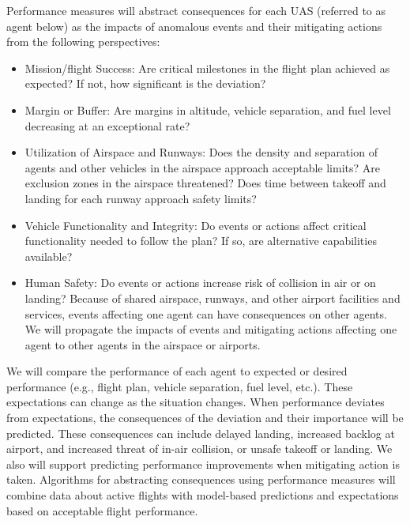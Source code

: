 Performance measures will abstract consequences for each UAS (referred
to as agent below) as the impacts of anomalous events and their
mitigating actions from the following perspectives:
\begin{itemize}
\item	Mission/flight Success: Are critical milestones in the flight plan achieved as expected?  If not, how significant is the deviation?
\item	Margin or Buffer: Are margins in altitude, vehicle separation, and fuel level decreasing at an exceptional rate?  
\item	Utilization of Airspace and Runways: Does the density and separation of agents and other vehicles in the airspace approach acceptable limits? Are exclusion zones in the airspace threatened? Does time between takeoff and landing for each runway approach safety limits?
\item	Vehicle Functionality and Integrity: Do events or actions affect critical functionality needed to follow the plan? If so, are alternative capabilities available?  
\item	Human Safety: Do events or actions increase risk of collision in air or on landing? 
Because of shared airspace, runways, and other airport facilities and services, events affecting one agent can have consequences on other agents. We will propagate the impacts of events and mitigating actions affecting one agent to other agents in the airspace or airports.
\end{itemize}

We will compare the performance of each agent to expected or desired
performance (e.g., flight plan, vehicle separation, fuel level,
etc.). These expectations can change as the situation changes. When
performance deviates from expectations, the consequences of the
deviation and their importance will be predicted. These consequences
can include delayed landing, increased backlog at airport, and
increased threat of in-air collision, or unsafe takeoff or landing. We
also will support predicting performance improvements when mitigating
action is taken. Algorithms for abstracting consequences using
performance measures will combine data about active flights with
model-based predictions and expectations based on acceptable flight
performance.

